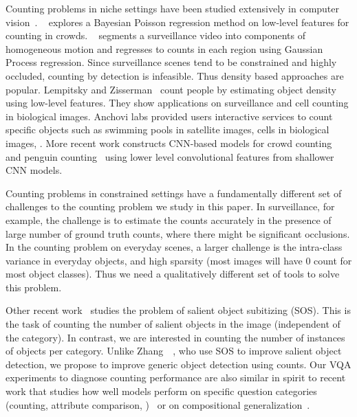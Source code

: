 \documentclass[10pt,twocolumn,letterpaper]{article}
\begin{document}
Counting problems in niche settings have been studied extensively in computer vision~\cite{Zhang2015,Segui2015,Chan2009BayesianCounting,Lempitsky2010}. ~\cite{Chan2009BayesianCounting} explores a Bayesian Poisson regression method on low-level features for counting in crowds. ~\cite{Chan2008PrivacyTracking} segments a surveillance video into components of homogeneous motion and regresses to counts in each region using Gaussian Process regression. Since surveillance scenes tend to be constrained and highly occluded, counting by detection is infeasible. Thus density based approaches are popular. Lempitsky and Zisserman~\cite{Lempitsky2010} count people by estimating object density using low-level features. They show applications on surveillance and cell counting in biological images. Anchovi labs provided users interactive services to count specific objects such as swimming pools in satellite images, cells in biological images, \etc. More recent work constructs CNN-based models for crowd counting~\cite{Zhang2015,onoro2016} and penguin counting~\cite{Arteta16} using lower level convolutional features from shallower CNN models.


Counting problems in constrained settings have a fundamentally different set of challenges to the counting problem we study in this paper. In surveillance, for example, the challenge is to estimate the counts accurately in the presence of large number of ground truth counts, where there might be significant occlusions. In the counting problem on everyday scenes, a larger challenge is the intra-class variance in everyday objects, and high sparsity (most images will have 0 count for most object classes). Thus we need a qualitatively different set of tools to solve this problem.


Other recent work~\cite{zhang2015salient} studies the problem of salient object subitizing (SOS). This is the task of counting the number of salient objects in the image (independent of the category). In contrast, we are interested in counting the number of instances of objects per category. Unlike Zhang~\etal~\cite{zhang2015salient}, who use SOS to improve salient object detection, we propose to improve generic object detection using counts. Our VQA experiments to diagnose counting performance are also similar in spirit to recent work that studies how well models perform on specific question categories (counting, attribute comparison, \etc)~\cite{johnson_CVPR_17} or on compositional generalization~\cite{Agarwal_EMNLP_2016}.
\end{document}
